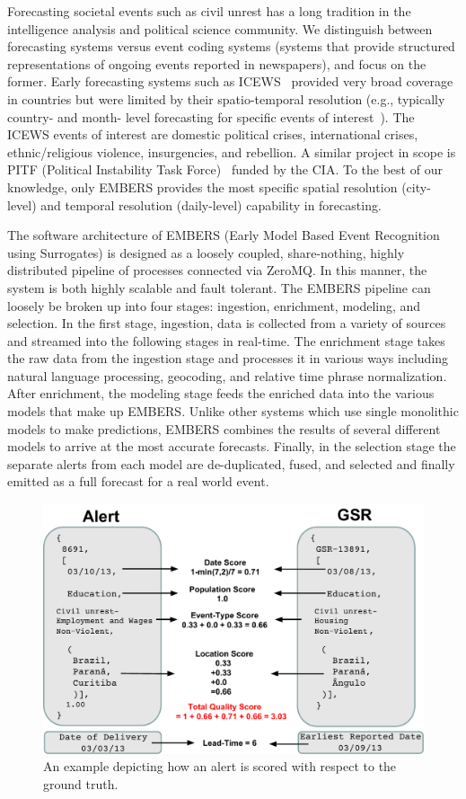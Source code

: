 \documentclass[11pt,a4paper,extrafontsizes,oneside]{article}
\begin{document}
Forecasting societal events such as civil unrest has a long tradition in the intelligence analysis and political science
community. We distinguish between forecasting systems versus event coding
systems (systems that provide
structured representations of ongoing events reported in newspapers), and focus on the former.
Early forecasting systems such as ICEWS~\cite{icews} provided very broad coverage in countries but
were limited by their spatio-temporal resolution (e.g., typically country- and month- level forecasting for
specific events of interest~\cite{eoiprediction}). The ICEWS events of interest are
domestic political crises, international crises, ethnic/religious violence, insurgencies,
and rebellion.
A similar project in scope is PITF (Political Instability
Task Force)~\cite{pitf} funded by the CIA.
To the best of our knowledge, only EMBERS provides
the most specific spatial resolution (city-level) and temporal resolution (daily-level) capability in forecasting.

The software architecture of EMBERS (Early Model Based Event Recognition using
Surrogates) is designed as a loosely coupled, share-nothing, highly distributed pipeline of
processes connected via ZeroMQ.  In this manner, the system is both highly scalable and fault
tolerant.  The EMBERS pipeline can loosely be broken up into four stages:
ingestion, enrichment, modeling, and selection.  In the first stage, ingestion,
data is collected from a variety of sources and streamed into the following
stages in real-time.  The enrichment stage takes the raw data from the ingestion stage
and processes it in various ways including natural language processing,
geocoding, and relative time phrase normalization.  After enrichment, the
modeling stage feeds the enriched data into the various models that make up
EMBERS.  Unlike other systems which use single monolithic models to make
predictions, EMBERS combines the results of several different models to arrive
at the most accurate forecasts.  Finally, in the selection stage the separate
alerts from each model are de-duplicated, fused, and selected and finally
emitted as a full forecast for a real world event.

\begin{figure}
\centering
  \includegraphics[width=0.7\columnwidth]{alert_vs_gsr}
\caption{An example depicting how an alert is scored with respect to the ground truth.}
\label{fig:alert}
\end{figure}
\end{document}
